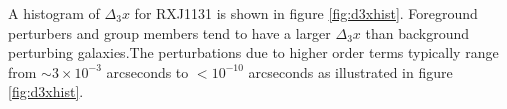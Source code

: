 A histogram of $\Delta_3 x$ for RXJ1131 is shown in figure \ref{fig:d3xhist}. Foreground perturbers and group members tend to have a larger $\Delta_3 x$ than background perturbing galaxies.The perturbations due to higher order terms typically range from $\sim 3 \times 10^{-3}$ arcseconds to $<10^{-10}$ arcseconds as illustrated in figure \ref{fig:d3xhist}.